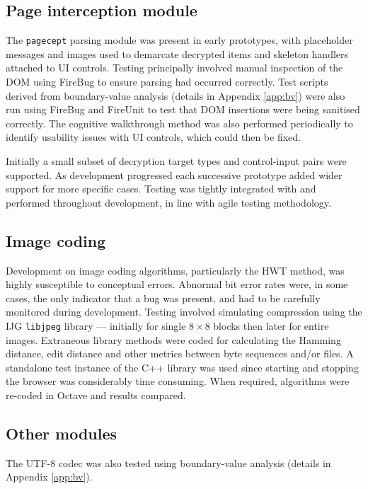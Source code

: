 \subsection{Page interception module}

The {\tt pagecept} parsing module was present in early prototypes, with placeholder messages and images used to demarcate decrypted items and skeleton handlers attached to UI controls. Testing principally involved manual inspection of the DOM using FireBug to ensure parsing had occurred correctly. Test scripts derived from boundary-value analysis (details in Appendix \ref{app:bv}) were also run using FireBug and FireUnit to test that DOM insertions were being sanitised correctly. The cognitive walkthrough method was also performed periodically to identify usability issues with UI controls, which could then be fixed.

Initially a small subset of decryption target types and control-input pairs were supported. As development progressed each successive prototype added wider support for more specific cases. Testing was tightly integrated with and performed throughout development, in line with agile testing methodology.


\subsection{Image coding}

Development on image coding algorithms, particularly the HWT method, was highly susceptible to conceptual errors. Abnormal bit error rates were, in some cases, the only indicator that a bug was present, and had to be carefully monitored during development. Testing involved simulating compression using the IJG {\tt libjpeg} library --- initially for single $8 \times 8$ blocks then later for entire images. Extraneous library methods were coded for calculating the Hamming distance, edit distance and other metrics between byte sequences and/or files. A standalone test instance of the C++ library was used since starting and stopping the browser was considerably time consuming. When required, algorithms were re-coded in Octave and results compared.

\subsection{Other modules}

The UTF-8 codec was also tested using boundary-value analysis (details in Appendix \ref{app:bv}). 

